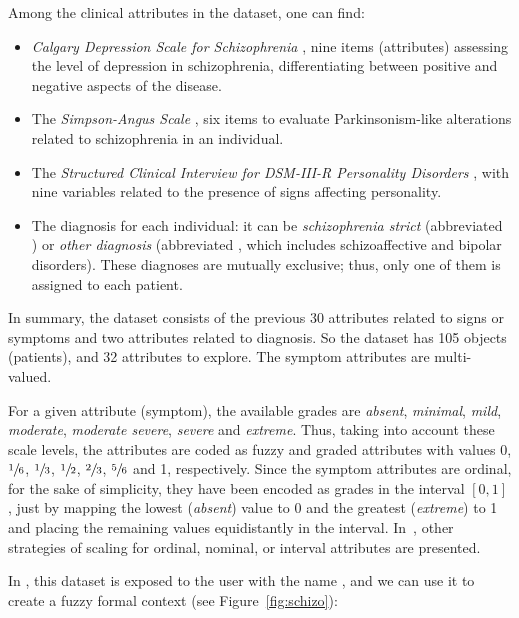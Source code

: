 Among the clinical attributes in the dataset, one can find:

\begin{itemize}
\tightlist
\item
  \emph{Calgary Depression Scale for Schizophrenia}
  \citep{addington1990depression}, nine items (attributes) assessing the
  level of depression in schizophrenia, differentiating between positive
  and negative aspects of the disease.
\item
  The \emph{Simpson-Angus Scale} \citep{simpson1970rating}, six items to
  evaluate Parkinsonism-like alterations related to schizophrenia in an
  individual.
\item
  The \emph{Structured Clinical Interview for DSM-III-R Personality
  Disorders} \citep{first1997user}, with nine variables related to the
  presence of signs affecting personality.
\item
  The diagnosis for each individual: it can be \emph{schizophrenia
  strict} (abbreviated ) or \emph{other diagnosis}
  (abbreviated , which includes schizoaffective and
  bipolar disorders). These diagnoses are mutually exclusive; thus, only
  one of them is assigned to each patient.
\end{itemize}

In summary, the dataset consists of the previous 30 attributes related
to signs or symptoms and two attributes related to diagnosis. So the
dataset has 105 objects (patients), and 32 attributes to explore. The
symptom attributes are multi-valued.

For a given attribute (symptom), the available grades are \emph{absent},
\emph{minimal}, \emph{mild}, \emph{moderate}, \emph{moderate severe},
\emph{severe} and \emph{extreme}. Thus, taking into account these scale
levels, the attributes are coded as fuzzy and graded attributes with
values 0, \(\sfrac{1}{6}\), \(\sfrac{1}{3}\), \(\sfrac{1}{2}\),
\(\sfrac{2}{3}\), \(\sfrac{5}{6}\) and 1, respectively. Since the symptom attributes are ordinal, for the sake of simplicity, they have been encoded as grades in the interval $[0, 1]$, just by mapping the lowest (\emph{absent}) value to 0 and the greatest (\emph{extreme}) to 1 and placing the remaining values equidistantly in the interval. In~\citet{ganter2016conceptual},  other strategies of scaling for ordinal, nominal, or interval attributes are presented.


In , this dataset is exposed to the user with the name
, and we can use it to create a fuzzy formal context (see
Figure~\ref{fig:schizo}):


